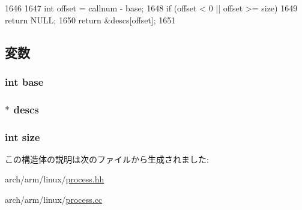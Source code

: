 \begin{DoxyCode}
1646 {
1647     int offset = callnum - base;
1648     if (offset < 0 || offset >= size)
1649         return NULL;
1650     return &descs[offset];
1651 }
\end{DoxyCode}


\subsection{変数}
\hypertarget{structArmLinuxProcessBits_1_1SyscallTable_a19437a5875428e719515fb20de8a6927}{
\subsubsection[{base}]{\setlength{\rightskip}{0pt plus 5cm}int {\bf base}}}
\label{structArmLinuxProcessBits_1_1SyscallTable_a19437a5875428e719515fb20de8a6927}
\hypertarget{structArmLinuxProcessBits_1_1SyscallTable_a1bb5ae25f325719fb834ca7b8046333a}{
\subsubsection[{descs}]{$\ast$ {\bf descs}}}
\label{structArmLinuxProcessBits_1_1SyscallTable_a1bb5ae25f325719fb834ca7b8046333a}
\hypertarget{structArmLinuxProcessBits_1_1SyscallTable_a439227feff9d7f55384e8780cfc2eb82}{
\subsubsection[{size}]{\setlength{\rightskip}{0pt plus 5cm}int {\bf size}}}
\label{structArmLinuxProcessBits_1_1SyscallTable_a439227feff9d7f55384e8780cfc2eb82}


この構造体の説明は次のファイルから生成されました:\begin{DoxyCompactItemize}
\item 
arch/arm/linux/\hyperlink{arch_2arm_2linux_2process_8hh}{process.hh}\item 
arch/arm/linux/\hyperlink{arch_2arm_2linux_2process_8cc}{process.cc}\end{DoxyCompactItemize}
